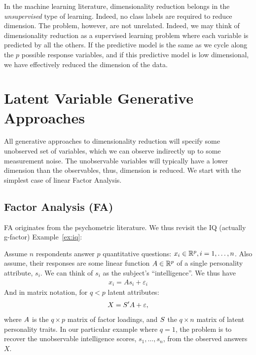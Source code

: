 \documentclass[12pt,a4paper]{article}
\begin{document}
In the machine learning literature, dimensionality reduction belongs in the \emph{unsupervised} type of learning. 
Indeed, no class labels are required to reduce dimension.
The problem, however, are not unrelated. 
Indeed, we may think of dimensionality reduction as a supervised learning problem where each variable is predicted by all the others. 
If the predictive model is the same as we cycle along the $p$ possible response variables, and if this predictive model is low dimensional, we have effectively reduced the dimension of the data. 








\section{Latent Variable Generative Approaches}
All generative approaches to dimensionality reduction will specify some unobserved set of variables, which we can observe indirectly up to some measurement noise. 
The unobservable variables will typically have a lower dimension than the observables, thus, dimension is reduced. 
We start with the simplest case of linear Factor Analysis. 


\subsection{Factor Analysis (FA)}

FA originates from the psychometric literature. 
We thus revisit the IQ (actually g-factor) Example~\ref{ex:iq}:
\begin{example}
	
	Assume $n$ respondents answer $p$ quantitative questions: $x_i \in \mathbb{R}^p, i=1,\dots,n$. 
	Also assume, their responses are some linear function $A \in \mathbb{R}^p$ of a single personality attribute, $s_i$. 
	We can think of $s_i$ as the subject's ``intelligence''.
	We thus have 
	\begin{align}
	x_i = A s_i + \varepsilon_i
	\end{align}
And in matrix notation, for $q<p$ latent attributes:
	\begin{align}
	\label{eq:factor}
	X = S' A  +\varepsilon,
	\end{align}
where $A$ is the $q \times p$ matrix of factor loadings, and $S$ the $q \times n$ matrix of latent personality traits. 
In our particular example where $q=1$, the problem is to recover the unobservable intelligence scores, $s_1,\dots,s_n$, from the observed answers $X$.	
\end{example}
\end{document}

